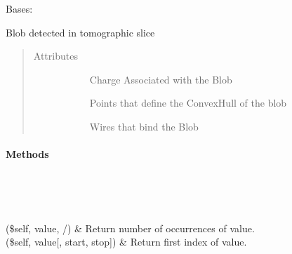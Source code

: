\documentclass[letterpaper,10pt,english]{sphinxmanual}
\begin{document}
\begin{fulllineitems}
\label{\detokenize{dataTypes:dataTypes.Blob}}
Bases: 

Blob detected in tomographic slice
\begin{quote}\begin{description}
\item[{Attributes}] \leavevmode\begin{description}
\item[{{\hyperref[\detokenize{dataTypes:dataTypes.Blob.charge}]{}}}] \leavevmode
Charge Associated with the Blob

\item[{{\hyperref[\detokenize{dataTypes:dataTypes.Blob.points}]{}}}] \leavevmode
Points that define the ConvexHull of the blob

\item[{{\hyperref[\detokenize{dataTypes:dataTypes.Blob.wires}]{}}}] \leavevmode
Wires that bind the Blob

\end{description}

\end{description}\end{quote}
\paragraph{Methods}


\begin{savenotes}\sphinxatlongtablestart\begin{longtable}{}
\hline

\endfirsthead

%
{}\\
\hline

\endhead

\hline
{}\\
\endfoot

\endlastfoot

(\$self, value, /)
&
Return number of occurrences of value.
\\
\hline
{}(\$self, value{[}, start, stop{]})
&
Return first index of value.
\\
\hline
\end{longtable}\sphinxatlongtableend\end{savenotes}


\end{fulllineitems}
\end{document}
